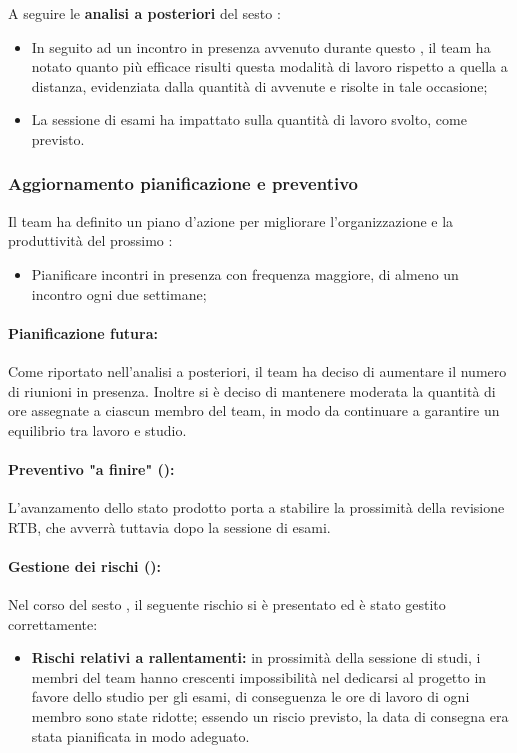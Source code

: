 \vspace{0.5\baselineskip}
\par A seguire le \textbf{analisi a posteriori} del sesto :
\begin{itemize}
  \item In seguito ad un incontro in presenza avvenuto durante questo , il team ha notato quanto più efficace risulti questa modalità di lavoro rispetto a quella a distanza, evidenziata dalla quantità di  avvenute e risolte in tale occasione;
  \item La sessione di esami ha impattato sulla quantità di lavoro svolto, come previsto.
\end{itemize}

\subsubsection{Aggiornamento pianificazione e preventivo}
\par Il team ha definito un piano d'azione per migliorare l'organizzazione e la produttività del prossimo :
\begin{itemize}
  \item Pianificare incontri in presenza con frequenza maggiore, di almeno un incontro ogni due settimane;
\end{itemize}

\paragraph*{Pianificazione futura:}
\par Come riportato nell'analisi a posteriori, il team ha deciso di aumentare il numero di riunioni in presenza.
Inoltre si è deciso di mantenere moderata la quantità di ore assegnate a ciascun membro del team, in modo da continuare a garantire un equilibrio tra lavoro e studio.

\paragraph*{Preventivo "a finire" ():}
\par L'avanzamento dello stato prodotto porta a stabilire la prossimità della revisione RTB, che avverrà tuttavia dopo la sessione di esami.

\paragraph*{Gestione dei rischi ():}
\par Nel corso del sesto , il seguente rischio si è presentato ed è stato gestito correttamente:
\begin{itemize}
  \item \textbf{Rischi relativi a rallentamenti:} in prossimità della sessione di studi, i membri del team hanno crescenti impossibilità nel dedicarsi al progetto in favore dello studio per gli esami, di conseguenza le ore di lavoro di ogni membro sono state ridotte; essendo un riscio previsto, la data di consegna era stata pianificata in modo adeguato.
\end{itemize}